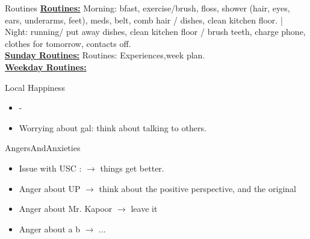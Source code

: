 \begin{columns}
\begin{column}{0.5\columnwidth}
\begin{columns}
  \begin{column}{0.20\linewidth}
    \begin{block}{Routines}
      { \tiny \underline{\bf Routines:} Morning: bfast, exercise/brush,
        floss, shower (hair, eyes, ears, underarms, feet), meds, belt,
        comb hair / dishes, clean kitchen floor. |  Night: running/ put
        away dishes, clean kitchen floor / brush teeth, charge phone,
        clothes for tomorrow, contacts off.}\\
      {\tiny \underline{\bf Sunday Routines:} Routines:
        Experiences,week plan.}\\ 
      {\tiny \underline{\bf Weekday Routines:}}\\
    \end{block} 
    \begin{block}{Local Happiness}
      \begin{itemize} 
        \tiny \item \tiny -
      \item \tiny Worrying about gal: think about talking to others.
      \end{itemize} 
    \end{block}
    \begin{block}{AngersAndAnxieties}
      \begin{itemize}
        \item \tiny Issue with USC : $\rightarrow$ things get better. 
        \tiny \item \tiny Anger about UP $\rightarrow$ think about the positive
        perspective, and the original
      \item \tiny Anger about Mr. Kapoor $\rightarrow$  leave it
      \item \tiny Anger about a b  $\rightarrow$ ...

\end{itemize}
\end{block}
\end{column}
\end{columns}
\end{column}
\end{columns}
